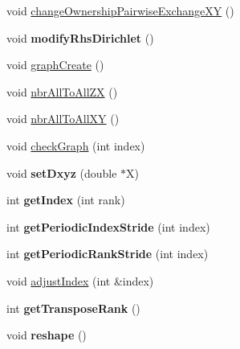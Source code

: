 \begin{DoxyCompactItemize}
\item 
void \mbox{\hyperlink{classPencilDcmp_a9a135d2665f56ef206861d5b7e0f84be}{change\+Ownership\+Pairwise\+Exchange\+XY}} ()
\item 
\mbox{\label{classPencilDcmp_a4811e6de65dea576803696f6c4e7f068}} 
void {\bfseries modify\+Rhs\+Dirichlet} ()
\item 
void \mbox{\hyperlink{classPencilDcmp_a6ba4438fd05274b40dd2e56aeba339e1}{graph\+Create}} ()
\item 
void \mbox{\hyperlink{classPencilDcmp_a06651ef577567ce90c4f7ad4d8fadf58}{nbr\+All\+To\+All\+ZX}} ()
\item 
void \mbox{\hyperlink{classPencilDcmp_a5a6415c2ca9d9bf54009ccfd252a76e5}{nbr\+All\+To\+All\+XY}} ()
\item 
void \mbox{\hyperlink{classPencilDcmp_acbb1930609563f24d408fb2a5766400b}{check\+Graph}} (int index)
\item 
\mbox{\label{classPencilDcmp_a2d6bd36234f5f8fd585461eefc2e2a48}} 
void {\bfseries set\+Dxyz} (double $\ast$X)
\item 
\mbox{\label{classPencilDcmp_a52e42ff66fb2ba16fdd776d91891d455}} 
int {\bfseries get\+Index} (int rank)
\item 
\mbox{\label{classPencilDcmp_aed55d37658908708a60d94b4cb4bdb7f}} 
int {\bfseries get\+Periodic\+Index\+Stride} (int index)
\item 
\mbox{\label{classPencilDcmp_a4b9993d599a4136137bd8d6f68180b87}} 
int {\bfseries get\+Periodic\+Rank\+Stride} (int index)
\item 
void \mbox{\hyperlink{classPencilDcmp_a653d1f3fec551d03a03ba9fdaf88ff96}{adjust\+Index}} (int \&index)
\item 
\mbox{\label{classPencilDcmp_ad7147b6c56b50aa50d09d8161000ba5f}} 
int {\bfseries get\+Transpose\+Rank} ()
\item 
\mbox{\label{classPencilDcmp_a82c24d74335e0f680b27de82cbb4e081}} 
void {\bfseries reshape} ()
\item 
\mbox{\label{classPencilDcmp_a68a2dcf09578241f71f845522d4c77a2}} 

\end{DoxyCompactItemize}
